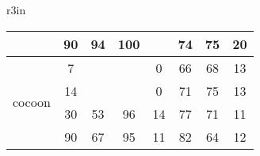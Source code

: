 \begin{wraptable}{r}{3in}
\begin{tabular}{c@{~}c|c@{~}c@{~}c|c@{~}c@{~}c}
                              & 90                                                   & 94        & 100     & \cellcolor[gray]{0.8}{100}       & 74         & 75       & 20      \\ \hline
 \multirow{4}{*}{cocoon}                             & 7                                                    & \cellcolor[gray]{0.8}{0}         & \cellcolor[gray]{0.8}{0}       & 0       & 66         & 68       & 13      \\ \cline{2-2}
                              & 14                                                   & \cellcolor[gray]{0.8}{0}         & \cellcolor[gray]{0.8}{0}       & 0       & 71         & 75       & 13      \\ \cline{2-2}
                              & 30                                                   & 53        & 96      & 14      & 77         & 71       & 11      \\ \cline{2-2}
                              & 90                                                   & 67        & 95      & 11      & 82         & 64       & 12      \\ \hline

\end{tabular}
\end{wraptable}
